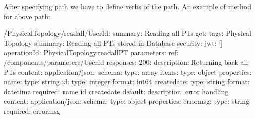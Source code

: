 \documentclass[letterpaper,10pt,english]{sphinxmanual}
\begin{document}
After specifying path we have to define verbs of the path.
An example of  method for above path:

\begin{sphinxVerbatim}[commandchars=\\\{\}]
/PhysicalTopology/read\PYGZus{}all/\PYGZob{}UserId\PYGZcb{}:
  summary: Reading all PT\PYGZsq{}s
  get:
    tags:
      \PYGZhy{} Physical Topology
    summary: Reading all PT\PYGZsq{}s stored in Database
    security:
      \PYGZhy{} jwt: []
    operationId: PhysicalTopology.read\PYGZus{}all\PYGZus{}PT
    parameters:
      \PYGZhy{} \PYGZdl{}ref: \PYGZsq{}\PYGZsh{}/components/parameters/UserId\PYGZsq{}
    responses:
      200:
        description: Returning back all PT\PYGZsq{}s
        content:
          application/json:
            schema:
              type: array
              items:
                type: object
                properties:
                  name:
                    type: string
                  id:
                    type: integer
                    format: int64
                  create\PYGZus{}date:
                    type: string
                    format: date\PYGZhy{}time
                required:
                  \PYGZhy{} name
                  \PYGZhy{} id
                  \PYGZhy{} create\PYGZus{}date
      default:
        description: error handling
        content:
          application/json:
            schema:
              type: object
              properties:
                error\PYGZus{}msg:
                  type: string
              required:
                \PYGZhy{} error\PYGZus{}msg
\end{sphinxVerbatim}
\end{document}
